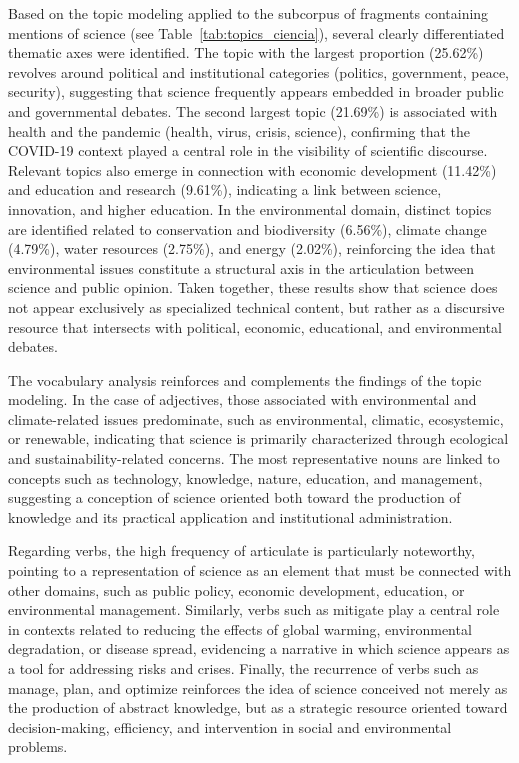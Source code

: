 \documentclass[11pt,a4paper]{article}
\begin{document}
Based on the topic modeling applied to the subcorpus of fragments containing mentions of science (see Table~\ref{tab:topics_ciencia}), several clearly differentiated thematic axes were identified. The topic with the largest proportion (25.62\%) revolves around political and institutional categories (politics, government, peace, security), suggesting that science frequently appears embedded in broader public and governmental debates. The second largest topic (21.69\%) is associated with health and the pandemic (health, virus, crisis, science), confirming that the COVID-19 context played a central role in the visibility of scientific discourse. Relevant topics also emerge in connection with economic development (11.42\%) and education and research (9.61\%), indicating a link between science, innovation, and higher education. In the environmental domain, distinct topics are identified related to conservation and biodiversity (6.56\%), climate change (4.79\%), water resources (2.75\%), and energy (2.02\%), reinforcing the idea that environmental issues constitute a structural axis in the articulation between science and public opinion. Taken together, these results show that science does not appear exclusively as specialized technical content, but rather as a discursive resource that intersects with political, economic, educational, and environmental debates.


The vocabulary analysis reinforces and complements the findings of the topic modeling. In the case of adjectives, those associated with environmental and climate-related issues predominate, such as environmental, climatic, ecosystemic, or renewable, indicating that science is primarily characterized through ecological and sustainability-related concerns. The most representative nouns are linked to concepts such as technology, knowledge, nature, education, and management, suggesting a conception of science oriented both toward the production of knowledge and its practical application and institutional administration.


Regarding verbs, the high frequency of articulate is particularly noteworthy, pointing to a representation of science as an element that must be connected with other domains, such as public policy, economic development, education, or environmental management. Similarly, verbs such as mitigate play a central role in contexts related to reducing the effects of global warming, environmental degradation, or disease spread, evidencing a narrative in which science appears as a tool for addressing risks and crises. Finally, the recurrence of verbs such as manage, plan, and optimize reinforces the idea of science conceived not merely as the production of abstract knowledge, but as a strategic resource oriented toward decision-making, efficiency, and intervention in social and environmental problems.
\end{document}
